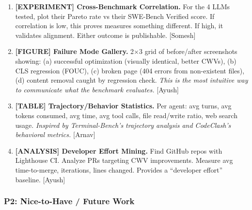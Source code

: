 \begin{enumerate}
    \item \textbf{[EXPERIMENT] Cross-Benchmark Correlation.} For the 4 LLMs tested, plot their \OurBench Pareto rate vs their SWE-Bench Verified score. If correlation is low, this proves \OurBench measures something different. If high, it validates alignment. Either outcome is publishable. [Somesh]

    \item \textbf{[FIGURE] Failure Mode Gallery.} 2$\times$3 grid of before/after screenshots showing: (a) successful optimization (visually identical, better CWVs), (b) CLS regression (FOUC), (c) broken page (404 errors from non-existent files), (d) content removal caught by regression check. \textit{This is the most intuitive way to communicate what the benchmark evaluates.} [Ayush]

    \item \textbf{[TABLE] Trajectory/Behavior Statistics.} Per agent: avg turns, avg tokens consumed, avg time, avg tool calls, file read/write ratio, web search usage. \textit{Inspired by Terminal-Bench's trajectory analysis and CodeClash's behavioral metrics.} [Arnav]

    \item \textbf{[ANALYSIS] Developer Effort Mining.} Find GitHub repos with Lighthouse CI. Analyze PRs targeting CWV improvements. Measure avg time-to-merge, iterations, lines changed. Provides a ``developer effort'' baseline. [Ayush]
    
\end{enumerate}

\subsubsection{P2: Nice-to-Have / Future Work}

